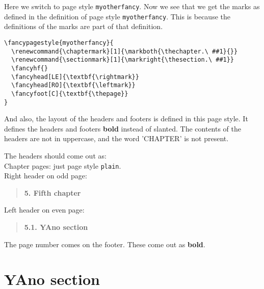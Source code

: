 \documentclass[openany]{book}
\renewcommand{\chaptermark}[1]{\markboth{\thechapter.\ #1}{}}
\renewcommand{\sectionmark}[1]{\markright{\thesection.\ #1}}
\renewcommand{\chaptermark}[1]{\markboth{\thechapter.\ ##1}{}}
\renewcommand{\sectionmark}[1]{\markright{\thesection.\ ##1}}
\renewcommand{\chaptermark}[1]{\markboth{\thechapter.\ ##1}{}}
\renewcommand{\sectionmark}[1]{\markright{\thesection.\ ##1}}
\begin{document}
\noindent
\begin{boxedminipage}{\textwidth}
Here we switch to page style \texttt{myotherfancy}.
Now we see that we get the marks as defined in the definition of page style \texttt{myotherfancy}.
This is because the definitions of the marks are  part of that definition.
\begin{verbatim}
\fancypagestyle{myotherfancy}{
  \renewcommand{\chaptermark}[1]{\markboth{\thechapter.\ ##1}{}}
  \renewcommand{\sectionmark}[1]{\markright{\thesection.\ ##1}}
  \fancyhf{}
  \fancyhead[LE]{\textbf{\rightmark}}
  \fancyhead[RO]{\textbf{\leftmark}}
  \fancyfoot[C]{\textbf{\thepage}}
}
\end{verbatim}

And also, the layout of the headers and footers is  defined in this page style. It defines the headers and footers \textbf{bold} instead of slanted.
The contents of the headers are not in uppercase, and the word 'CHAPTER' is not present.

The headers should come out as:
\\
Chapter pages: just page style \texttt{plain}.
\\
Right header on odd page:
\begin{quote}
  \textbf{5. Fifth chapter}
\end{quote}
Left header on even page:
\begin{quote}
  \textbf{5.1. YAno section}
\end{quote}
The page number comes on the footer.
These come out as \textbf{bold}.
\end{boxedminipage}
\bigskip

\lipsum[1]

\section{YAno section}

\lipsum
\end{document}
